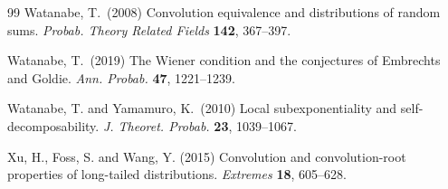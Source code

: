 \documentclass[12pt,leqno]{amsart}
\newcommand{\1}{{\mathbf 1}}
\begin{document}
\begin{thebibliography}{99}
{\sc Watanabe, T.}\ (2008) 
Convolution equivalence and distributions of random sums. 
{\em Probab. Theory Related Fields} {\bf 142}, 367--397. 


{\sc Watanabe, T.}\ (2019) 
The Wiener condition and the conjectures of Embrechts and Goldie.
{\em Ann. Probab.} {\bf 47}, 1221--1239.

{\sc Watanabe, T. and Yamamuro, K.}\ (2010) 
Local subexponentiality and self-decomposability. 
{\em J. Theoret. Probab.} {\bf 23}, 1039--1067. 


Xu, H., Foss, S. and Wang, Y. (2015) 
Convolution and convolution-root properties of long-tailed distributions. 
{\em Extremes} {\bf 18}, 605--628.



\end{thebibliography}
\end{document}

